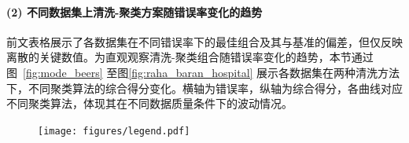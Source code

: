 \documentclass[10pt]{article} %
\numberwithin{equation}{section}
\begin{document}
\paragraph{(2) 不同数据集上清洗-聚类方案随错误率变化的趋势}
前文表格展示了各数据集在不同错误率下的最佳组合及其与基准的偏差，但仅反映离散的关键数值。为直观观察清洗-聚类组合随错误率变化的趋势，本节通过图~\ref{fig:mode_beers} 至图\ref{fig:raha_baran_hospital} 展示各数据集在两种清洗方法下，不同聚类算法的综合得分变化。横轴为错误率，纵轴为综合得分，各曲线对应不同聚类算法，体现其在不同数据质量条件下的波动情况。
\begin{figure}[htbp]
    \centering
    \texttt{[image: figures/legend.pdf]} %
    \vspace{-10pt} %
\end{figure}

\FloatBarrier
\end{document}
